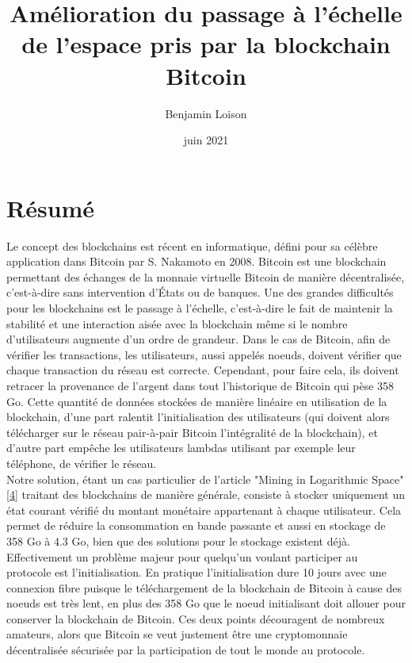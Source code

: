 \documentclass[12pt,a4paper]{article}
\newcommand{\source}[1]{\hyperlink{#1}{[#1]}}
\begin{document}
	\title{Amélioration du passage à l'échelle de l'espace pris par la blockchain Bitcoin} %
	\author{Benjamin Loison}
	\date{juin 2021}
	\maketitle

	
	\section{Résumé}
	
	Le concept des blockchains est récent en informatique, défini pour sa célèbre application dans Bitcoin par S. Nakamoto en 2008. Bitcoin est une blockchain permettant des échanges de la monnaie virtuelle Bitcoin de manière décentralisée, c'est-à-dire sans intervention d'États ou de banques. Une des grandes difficultés pour les blockchains est le passage à l'échelle, c'est-à-dire le fait de maintenir la stabilité et une interaction aisée avec la blockchain même si le nombre d'utilisateurs augmente d'un ordre de grandeur. Dans le cas de Bitcoin, afin de vérifier les transactions, les utilisateurs, aussi appelés noeuds, doivent vérifier que chaque transaction du réseau est correcte. Cependant, pour faire cela, ils doivent retracer la provenance de l'argent dans tout l'historique de Bitcoin qui pèse 358 Go. Cette quantité de données stockées de manière linéaire en utilisation de la blockchain, d'une part ralentit l'initialisation des utilisateurs (qui doivent alors télécharger sur le réseau pair-à-pair Bitcoin l'intégralité de la blockchain), et d'autre part empêche les utilisateurs lambdas utilisant par exemple leur téléphone, de vérifier le réseau.\\
  Notre solution, étant un cas particulier de l'article "Mining in Logarithmic Space" \source{4} traitant des blockchains de manière générale, consiste à stocker uniquement un état courant vérifié du montant monétaire appartenant à chaque utilisateur. Cela permet de réduire la consommation en bande passante et aussi en stockage de 358 Go à 4.3 Go, bien que des solutions pour le stockage existent déjà. Effectivement un problème majeur pour quelqu'un voulant participer au protocole est l'initialisation. En pratique l'initialisation dure 10 jours avec une connexion fibre puisque le téléchargement de la blockchain de Bitcoin à cause des noeuds est très lent, en plus des 358 Go que le noeud initialisant doit allouer pour conserver la blockchain de Bitcoin. Ces deux points découragent de nombreux amateurs, alors que Bitcoin se veut justement être une cryptomonnaie décentralisée sécurisée par la participation de tout le monde au protocole.\\
\end{document}

